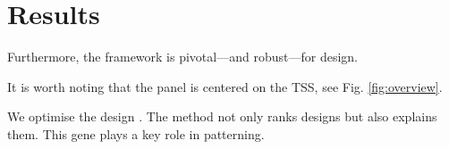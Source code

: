 \section{Results}

Furthermore, the framework is pivotal---and robust---for design.

It is worth noting that the panel is centered on the TSS, see Fig. \ref{fig:overview}.

We optimise the design . The method not only ranks designs but also explains them. This gene plays a key role in patterning.
